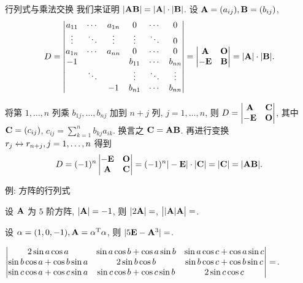 \begin{frame}{行列式与乘法交换}
	\onslide<+->
	我们来证明 $|{\mathbf{A}}{\mathbf{B}}|=|{\mathbf{A}}|\cdot|{\mathbf{B}}|$.
	\onslide<+->
	设 ${\mathbf{A}}=(a_{ij}),{\mathbf{B}}=(b_{ij})$,
	\[D=\left|\begin{matrix}
		a_{11}&\cdots&a_{1n}&0&\cdots&0\\
		\vdots&\ddots&\vdots&\vdots&\ddots&0\\
		a_{1n}&\cdots&a_{nn}&0&\cdots&0\\
		-1&&&b_{11}&\cdots&b_{nn}\\
		&\ddots&&\vdots&\ddots&\vdots\\
		&&-1&b_{n1}&\cdots&b_{nn}
	\end{matrix}\right|=\left|\begin{matrix}{\mathbf{A}}&{\mathbf{O}}\\-{\mathbf{E}}&{\mathbf{B}}\end{matrix}\right|=|{\mathbf{A}}|\cdot|{\mathbf{B}}|.\]

	\onslide<+->
	将第 $1,\dots,n$ 列乘 $b_{1j},\dots,b_{nj}$ 加到 $n+j$ 列, $j=1,\dots,n$, 则 	$D=\left|\begin{matrix}{\mathbf{A}}&{\mathbf{C}}\\-{\mathbf{E}}&{\mathbf{O}}\end{matrix}\right|$,
	\onslide<+->
	其中 ${\mathbf{C}}=(c_{ij})$, $c_{ij}=\sum_{k=1}^nb_{kj}a_{ik}$.
	\onslide<+->
	换言之 ${\mathbf{C}}={\mathbf{A}}{\mathbf{B}}$.
	\onslide<+->
	再进行变换 $r_j\leftrightarrow r_{n+j},j=1,\dots,n$ 得到
	\[D=(-1)^n\left|\begin{matrix}-{\mathbf{E}}&{\mathbf{O}}\\{\mathbf{A}}&{\mathbf{C}}\end{matrix}\right|=(-1)^n|-{\mathbf{E}}|\cdot|{\mathbf{C}}|=|{\mathbf{C}}|=|{\mathbf{A}}{\mathbf{B}}|.\]
\end{frame}


\begin{frame}{例: 方阵的行列式}
	\onslide<+->
	\begin{exercise}
		设 ${\mathbf{A}}$ 为 $5$ 阶方阵, $|{\mathbf{A}}|=-1$, 则
		$|2{\mathbf{A}}|=$,
		$\bigl||{\mathbf{A}}|{\mathbf{A}}\bigr|=$.
	\end{exercise}
	\onslide<+->
	\begin{exercise}
		设 $\alpha=(1,0,-1),{\mathbf{A}}=\alpha^{\mathrm{T}}\alpha$, 则
		$|5{\mathbf{E}}-{\mathbf{A}}^3|=$\fillblank{\visible<+->{$-75$}}.
	\end{exercise}
	\onslide<+->
	\begin{exercise}
		$\left|\begin{matrix}
			2\sin a\cos a&\sin a\cos b+\cos a\sin b&\sin a\cos c+\cos a\sin c\\
			\sin b\cos a+\cos b\sin a&2\sin b\cos b&\sin b\cos c+\cos b\sin c\\
			\sin c\cos a+\cos c\sin a&\sin c\cos b+\cos c\sin b&2\sin c\cos c
		\end{matrix}\right|=$\fillblank{\visible<+->{$0$}}.
	\end{exercise}
\end{frame}

